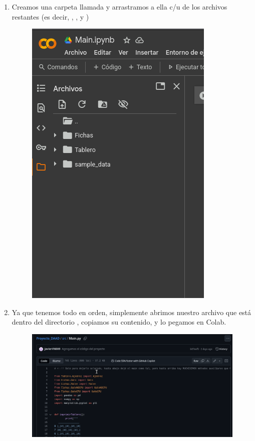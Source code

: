 \documentclass[12pt, Tahoma]{article}
\begin{document}
\begin{enumerate}
\begin{figure}[H]
			\end{figure}
		\item Creamos una carpeta llamada  y arrastramos a ella c/u de los archivos restantes (es decir, , ,  y )
			\begin{figure}[H]
				\centering
				\includegraphics[scale=2]{correr18.png}
			\end{figure}
		\item Ya que tenemos todo en orden, simplemente abrimos nuestro archivo  que está dentro del directorio , copiamos su contenido, y lo pegamos en Colab.
			\begin{figure}[H]
				\centering
				\includegraphics[scale=0.4]{correr19.png}

\end{figure}
\end{enumerate}
\end{document}
